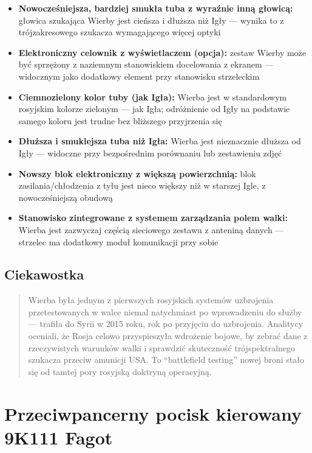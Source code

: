 \documentclass[12pt,oneside]{book}
\providecommand{\tightlist}{%
  \setlength{\itemsep}{0pt}\setlength{\parskip}{0pt}}
\begin{document}
\begin{itemize}
\tightlist
\item
  \textbf{Nowocześniejsza, bardziej smukła tuba z wyraźnie inną
  głowicą:} głowica szukająca Wierby jest cieńsza i dłuższa niż Igły ---
  wynika to z trójzakresowego szukacza wymagającego więcej optyki
\item
  \textbf{Elektroniczny celownik z wyświetlaczem (opcja):} zestaw Wierby
  może być sprzężony z naziemnym stanowiskiem docelowania z ekranem ---
  widocznym jako dodatkowy element przy stanowisku strzeleckim
\item
  \textbf{Ciemnozielony kolor tuby (jak Igła):} Wierba jest w
  standardowym rosyjskim kolorze zielonym --- jak Igła; odróżnienie od
  Igły na podstawie samego koloru jest trudne bez bliższego przyjrzenia
  się
\item
  \textbf{Dłuższa i smuklejsza tuba niż Igła:} Wierba jest nieznacznie
  dłuższa od Igły --- widoczne przy bezpośrednim porównaniu lub
  zestawieniu zdjęć
\item
  \textbf{Nowszy blok elektroniczny z większą powierzchnią:} blok
  zasilania/chłodzenia z tyłu jest nieco większy niż w starszej Igle, z
  nowocześniejszą obudową
\item
  \textbf{Stanowisko zintegrowane z systemem zarządzania polem walki:}
  Wierba jest zazwyczaj częścią sieciowego zestawu z anteniną danych ---
  strzelec ma dodatkowy moduł komunikacji przy sobie
\end{itemize}

\subsection{Ciekawostka}\label{ciekawostka-48}

\begin{quote}
Wierba była jednym z pierwszych rosyjskich systemów uzbrojenia
przetestowanych w walce niemal natychmiast po wprowadzeniu do służby ---
trafiła do Syrii w 2015 roku, rok po przyjęciu do uzbrojenia. Analitycy
oceniali, że Rosja celowo przyspieszyła wdrożenie bojowe, by zebrać dane
z rzeczywistych warunków walki i sprawdzić skuteczność trójspektralnego
szukacza przeciw amunicji USA. To ``battlefield testing'' nowej broni
stało się od tamtej pory rosyjską doktryną operacyjną.
\end{quote}

\section{Przeciwpancerny pocisk kierowany 9K111
Fagot}\label{przeciwpancerny-pocisk-kierowany-9k111-fagot}
\end{document}
